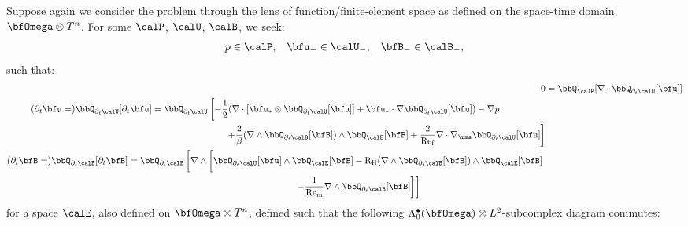     Suppose again we consider the problem through the lens of function/finite-element space as defined on the space-time domain, $\bfOmega\otimes T^{n}$. For some $\calP$, $\calU$, $\calB$, we seek:
    \begin{align}
        p         \in  \calP,  &&
        \bfu_{-}  \in  \calU_{-},  &&
        \bfB_{-}  \in  \calB_{-},
    \end{align}
    such that:
    \begin{align}
            0
            &=
            \bbQ_{\calP}[\nabla\cdot\bbQ_{\partial_{t}\calU}[\bfu]]  \label{eqn:incompressible MHD weak form 1}  \\
        \begin{split}
            (\partial_{t}\bfu
            =)
            \bbQ_{\partial_{t}\calU}[\partial_{t}\bfu]
            &=
            \bbQ_{\partial_{t}\calU}\left[- \frac{1}{2}(\nabla\cdot\left[\bfu_{*}\otimes\bbQ_{\partial_{t}\calU}[\bfu]\right]
            + \bfu_{*}\cdot\nabla\bbQ_{\partial_{t}\calU}[\bfu])
            - \nabla p\right.  \\
            &\qquad\qquad\qquad\qquad\left.+ \frac{2}{\beta}(\nabla\wedge\bbQ_{\partial_{t}\calB}[\bfB])\wedge\bbQ_{\calE}[\bfB]
            + \frac{2}{\rmRef}\nabla\cdot\nabla_{\rms}\bbQ_{\partial_{t}\calU}[\bfu]\right]
        \end{split}  \\
        \begin{split}
            (\partial_{t}\bfB
            =)
            \bbQ_{\partial_{t}\calB}[\partial_{t}\bfB]
            &=
            \bbQ_{\partial_{t}\calB}\left[\nabla\wedge\left[\bbQ_{\partial_{t}\calU}[\bfu]\wedge\bbQ_{\calE}[\bfB]
            - \rmRH(\nabla\wedge\bbQ_{\partial_{t}\calB}[\bfB])\wedge\bbQ_{\calE}[\bfB]\tall\right.\right.  \\
            &\qquad\qquad\qquad\qquad\qquad\qquad\qquad\qquad\qquad\left.\left.- \frac{1}{\rmRem}\nabla\wedge\bbQ_{\partial_{t}\calB}[\bfB]\right]\right]
        \end{split}
    \end{align}
    for a space $\calE$, also defined on $\bfOmega\otimes T^{n}$, defined such that the following $\Lambda_{0}^{\bullet}(\bfOmega)\otimes L^{2}$-subcomplex diagram commutes:
    \begin{center}\end{center}
